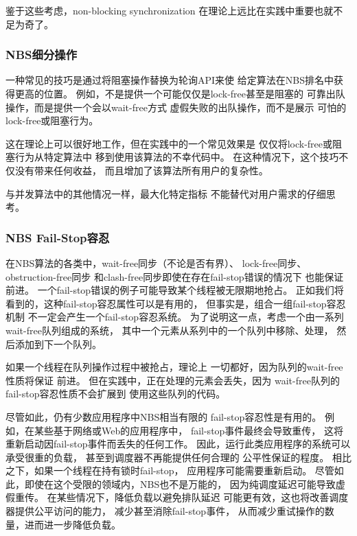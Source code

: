 鉴于这些考虑，non-blocking synchronization
在理论上远比在实践中重要也就不足为奇了。

\subsubsection{NBS细分操作}
\label{sec:advsync:NBS Subdivided Operations}

一种常见的技巧是通过将阻塞操作替换为轮询API来使
给定算法在NBS排名中获得更高的位置\@。
例如，不是提供一个可能仅仅是lock-free甚至是阻塞的
可靠出队操作，而是提供一个会以wait-free方式
虚假失败的出队操作，而不是展示
可怕的lock-free或阻塞行为。

这在理论上可以很好地工作，但在实践中的一个常见效果是
仅仅将lock-free或阻塞行为从特定算法中
移到使用该算法的不幸代码中。
在这种情况下，这个技巧不仅没有带来任何收益，
而且增加了该算法所有用户的复杂性。

与并发算法中的其他情况一样，最大化特定指标
不能替代对用户需求的仔细思考。

\subsubsection{NBS Fail-Stop容忍}
\label{sec:advsync:NBS Fail-Stop Tolerance}

在NBS算法的各类中，wait-free同步（不论是否有界）、
lock-free同步、obstruction-free同步
和clash-free同步即使在存在fail-stop错误的情况下
也能保证前进。
一个fail-stop错误的例子可能导致某个线程被无限期地抢占。
正如我们将看到的，这种fail-stop容忍属性可以是有用的，
但事实是，组合一组fail-stop容忍机制
不一定会产生一个fail-stop容忍系统。
为了说明这一点，考虑一个由一系列wait-free队列组成的系统，
其中一个元素从系列中的一个队列中移除、处理，
然后添加到下一个队列。

如果一个线程在队列操作过程中被抢占，理论上
一切都好，因为队列的wait-free性质将保证
前进。
但在实践中，正在处理的元素会丢失，因为
wait-free队列的fail-stop容忍性质不会扩展到
使用这些队列的代码。

尽管如此，仍有少数应用程序中NBS相当有限的
fail-stop容忍性是有用的。
例如，在某些基于网络或Web的应用程序中，
fail-stop事件最终会导致重传，
这将重新启动因fail-stop事件而丢失的任何工作。
因此，运行此类应用程序的系统可以承受很重的负载，
甚至到调度器不再能提供任何合理的
公平性保证的程度。
相比之下，如果一个线程在持有锁时fail-stop，
应用程序可能需要重新启动。
尽管如此，即使在这个受限的领域内，NBS也不是万能的，
因为纯调度延迟可能导致虚假重传。
在某些情况下，降低负载以避免排队延迟
可能更有效，这也将改善调度器提供公平访问的能力，
减少甚至消除fail-stop事件，
从而减少重试操作的数量，进而进一步降低负载。

